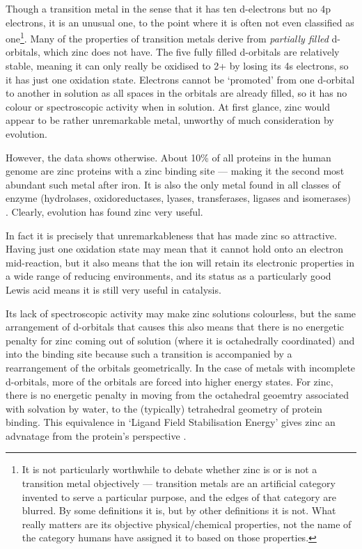 Though a transition metal in the sense that it has ten d-electrons but no 4p electrons, it is an unusual one, to the point where it is often not even classified as one\footnote{It is not particularly worthwhile to debate whether zinc is or is not a transition metal objectively --- transition metals are an artificial category invented to serve a particular purpose, and the edges of that category are blurred. By some definitions it is, but by other definitions it is not. What really matters are its objective physical/chemical properties, not the name of the category humans have assigned it to based on those properties.}. Many of the properties of transition metals derive from \emph{partially filled} d-orbitals, which zinc does not have. The five fully filled d-orbitals are relatively stable, meaning it can only really be oxidised to 2+ by losing its 4s electrons, so it has just one oxidation state. Electrons cannot be `promoted' from one d-orbital to another in solution as all spaces in the orbitals are already filled, so it has no colour or spectroscopic activity when in solution. At first glance, zinc would appear to be rather unremarkable metal, unworthy of much consideration by evolution.

However, the data shows otherwise. About 10\% of all proteins in the human genome are zinc proteins with a zinc binding site \cite{andreini2006counting} --- making it the second most abundant such metal after iron. It is also the only metal found in all classes of enzyme (hydrolases, oxidoreductases, lyases, transferases, ligases and isomerases) \cite{vallee1990zinc}. Clearly, evolution has found zinc very useful.

In fact it is precisely that unremarkableness that has made zinc so attractive. Having just one oxidation state may mean that it cannot hold onto an electron mid-reaction, but it also means that the ion will retain its electronic properties in a wide range of reducing environments, and its status as a particularly good Lewis acid means it is still very useful in catalysis. 

Its lack of spectroscopic activity may make zinc solutions colourless, but the same arrangement of d-orbitals that causes this also means that there is no energetic penalty for zinc coming out of solution (where it is octahedrally coordinated) and into the binding site because such a transition is accompanied by a rearrangement of the orbitals geometrically. In the case of metals with incomplete d-orbitals, more of the orbitals are forced into higher energy states. For zinc, there is no energetic penalty in moving from the octahedral geoemtry associated with solvation by water, to the (typically) tetrahedral geometry of protein binding. This equivalence in `Ligand Field Stabilisation Energy' gives zinc an advnatage from the protein's perspective \cite{lachenmann2004zinc}.

